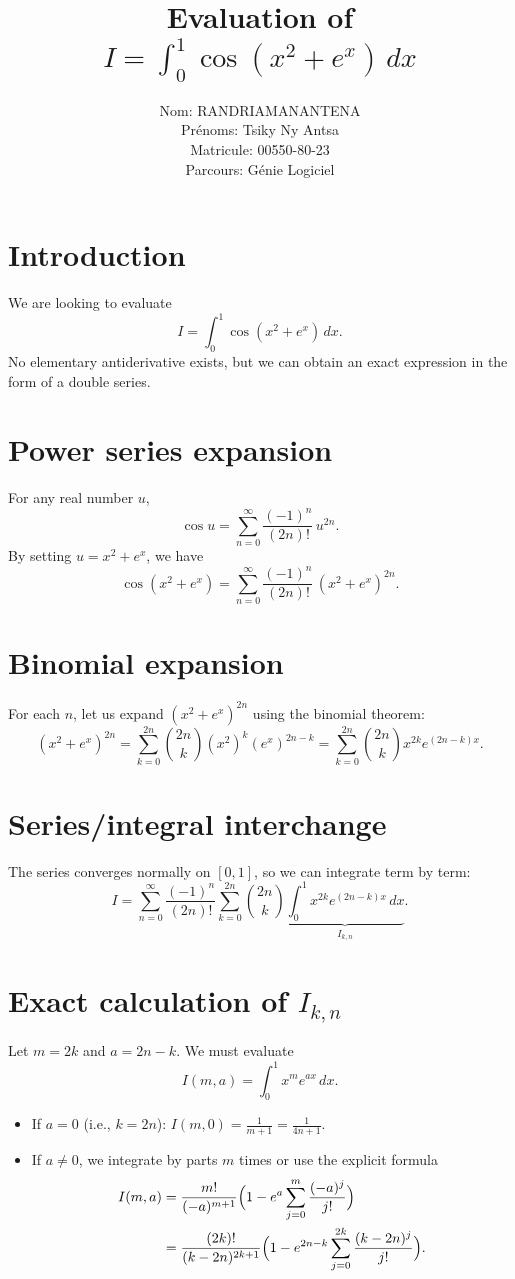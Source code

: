 \documentclass[a4paper,12pt]{article}
\title{Evaluation of \(\displaystyle I = \int_0^1 \cos(x^2+e^x)\,dx\)}
\author{Nom: RANDRIAMANANTENA \\
Prénoms: Tsiky Ny Antsa \\
Matricule: 00550-80-23 \\
Parcours: Génie Logiciel}
\date{}
\begin{document}
\maketitle

\section{Introduction}
We are looking to evaluate 
\[
I = \int_0^1 \cos(x^2 + e^x)\,dx .
\]
No elementary antiderivative exists, but we can obtain an exact expression in the form of a double series.

\section{Power series expansion}
For any real number $u$,
\[
\cos u = \sum_{n=0}^{\infty} \frac{(-1)^n}{(2n)!}\, u^{2n}.
\]
By setting $u = x^2 + e^x$, we have
\[
\cos(x^2+e^x) = \sum_{n=0}^{\infty} \frac{(-1)^n}{(2n)!}\, (x^2+e^x)^{2n}.
\]

\section{Binomial expansion}
For each $n$, let us expand $(x^2+e^x)^{2n}$ using the binomial theorem:
\[
(x^2+e^x)^{2n} = \sum_{k=0}^{2n} \binom{2n}{k} (x^2)^k (e^x)^{2n-k}
= \sum_{k=0}^{2n} \binom{2n}{k} x^{2k} e^{(2n-k)x}.
\]

\section{Series/integral interchange}
The series converges normally on $[0,1]$, so we can integrate term by term:
\[
I = \sum_{n=0}^{\infty} \frac{(-1)^n}{(2n)!}
\sum_{k=0}^{2n} \binom{2n}{k}
\underbrace{\int_0^1 x^{2k} e^{(2n-k)x}\,dx}_{I_{k,n}} .
\]

\section{Exact calculation of \(I_{k,n}\)}
Let $m = 2k$ and $a = 2n-k$. We must evaluate
\[
I(m,a) = \int_0^1 x^{m} e^{a x}\,dx .
\]
\begin{itemize}
\item If $a = 0$ (i.e., $k=2n$): $\displaystyle I(m,0) = \frac{1}{m+1} = \frac{1}{4n+1}$.
\item If $a \neq 0$, we integrate by parts $m$ times or use the explicit formula
\begin{align*}
I(m,a) &= \frac{m!}{(-a)^{m+1}}\Bigl(1 - e^{a}\sum_{j=0}^{m}\frac{(-a)^j}{j!}\Bigr) \\
&= \frac{(2k)!}{(k-2n)^{2k+1}}\Bigl(1 - e^{2n-k}\sum_{j=0}^{2k}\frac{(k-2n)^j}{j!}\Bigr).
\end{align*}
\end{itemize}
\end{document}

